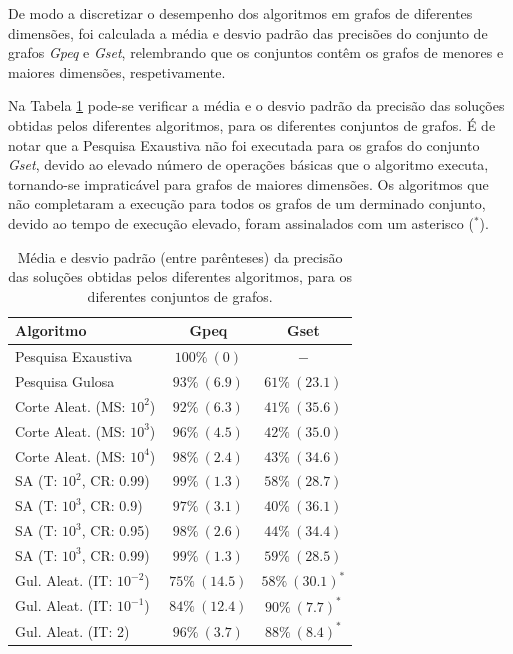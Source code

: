 \documentclass[mirror, portugues]{revdetua}
\begin{document}
De modo a discretizar o desempenho dos algoritmos em grafos de diferentes dimensões, foi calculada a média e desvio padrão das precisões do conjunto de grafos \textit{Gpeq} e \textit{Gset}, relembrando que os conjuntos contêm os grafos de menores e maiores dimensões, respetivamente.

Na Tabela \ref{table:precision} pode-se verificar a média e o desvio padrão da precisão das soluções obtidas pelos diferentes algoritmos, para os diferentes conjuntos de grafos. É de notar que a Pesquisa Exaustiva não foi executada para os grafos do conjunto \textit{Gset}, devido ao elevado número de operações básicas que o algoritmo executa, tornando-se impraticável para grafos de maiores dimensões. Os algoritmos que não completaram a execução para todos os grafos de um derminado conjunto, devido ao tempo de execução elevado, foram assinalados com um asterisco ($^*$).


\begin{table}[H]
\centering
\caption{Média e desvio padrão (entre parênteses) da precisão das soluções obtidas pelos diferentes algoritmos, para os diferentes conjuntos de grafos.}
\label{table:precision}
\begin{tabular}{lcc}
\toprule
\textbf{Algoritmo} & \textbf{Gpeq} & \textbf{Gset} \\
\midrule
Pesquisa Exaustiva & $100\% \ (0)$ & $-$ \\
Pesquisa Gulosa & $93\% \ (6.9)$ & $61\% \ (23.1)$ \\
Corte Aleat. (MS: $10^2$) & $92\% \ (6.3)$ & $41\% \ (35.6)$ \\
Corte Aleat. (MS: $10^3$) & $96\% \ (4.5)$ & $42\% \ (35.0)$ \\
Corte Aleat. (MS: $10^4$) & $98\% \ (2.4)$ & $43\% \ (34.6)$ \\
SA (T: $10^2$, CR: 0.99) & $99\% \ (1.3)$ & $58\% \ (28.7)$ \\
SA (T: $10^3$, CR: 0.9) & $97\% \ (3.1)$ & $40\% \ (36.1)$ \\
SA (T: $10^3$, CR: 0.95) & $98\% \ (2.6)$ & $44\% \ (34.4)$ \\
SA (T: $10^3$, CR: 0.99) & $99\% \ (1.3)$ & $59\% \ (28.5)$ \\
Gul. Aleat. (IT: $10^{-2}$) & $75\% \ (14.5)$ & $58\% \ (30.1)^*$\\
Gul. Aleat. (IT: $10^{-1}$) & $84\% \ (12.4)$ & $90\% \ (7.7)^*$\\
Gul. Aleat. (IT: 2) & $96\% \ (3.7)$ & $88\% \ (8.4)^*$ \\
\bottomrule
\end{tabular}
\end{table}
\end{document}
